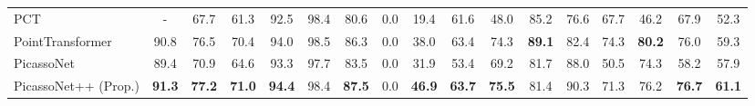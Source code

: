 \begin{table*}[!t]
\begin{adjustbox}{width=1\textwidth}
{\begin{tabular}{l|ccc|ccccccccccccc}
{\color{black}PCT~\cite{guo2021pct}} &-&67.7 & 61.3 & 92.5 &98.4 &80.6 &0.0 & 19.4 & 61.6& 48.0& 85.2& 76.6& 67.7& 46.2&  67.9& 52.3 \\
PointTransformer\cite{zhao2021point} & 90.8& 76.5& 70.4& 94.0& 98.5& 86.3& 0.0& 38.0& 63.4& 74.3& \textbf{89.1}& 82.4& 74.3& \textbf{80.2}& 76.0& 59.3\\
\hline
{\color{black}PicassoNet~\cite{lei2021picasso}} & 89.4 &70.9 &64.6 &93.3 &97.7 &83.5 &0.0
&31.9 &53.4 &69.2  &81.7
&88.0
&50.5
&74.3  &58.2 &57.9\\
{\color{black}PicassoNet++ (Prop.)} & \textbf{91.3} &\textbf{77.2} &\textbf{71.0} &\textbf{94.4}&98.4 &\textbf{87.5} &0.0 &\textbf{46.9} &\textbf{63.7} &\textbf{75.5}  &81.4 &90.3
&71.3&76.2 &\textbf{76.7}&\textbf{61.1}\\
\hline
\end{tabular}}
\end{adjustbox}
\end{table*}

